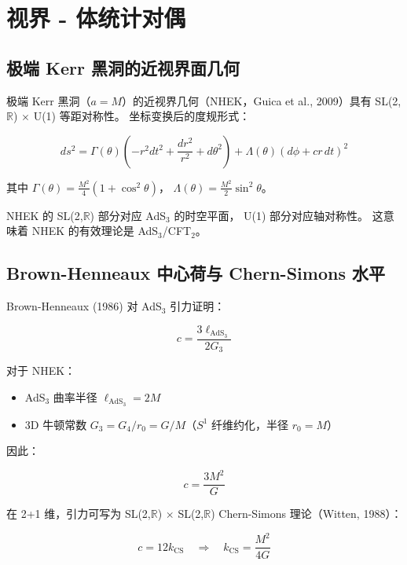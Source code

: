 \documentclass[11pt,a4paper]{article}
\begin{document}
\section{视界 - 体统计对偶}

\subsection{极端 Kerr 黑洞的近视界面几何}

极端 Kerr 黑洞（$a = M$）的近视界几何（NHEK，Guica et al., 2009）具有
SL(2,$\mathbb{R}$) $\times$ U(1) 等距对称性。
坐标变换后的度规形式：

\begin{equation}
ds^2 = \Gamma(\theta)\left(-r^2 dt^2 + \frac{dr^2}{r^2} + d\theta^2\right) + \Lambda(\theta)(d\phi + cr\,dt)^2
\end{equation}

其中 $\Gamma(\theta) = \frac{M^2}{4}(1+\cos^2\theta)$，
$\Lambda(\theta) = \frac{M^2}{2}\sin^2\theta$。

NHEK 的 SL(2,$\mathbb{R}$) 部分对应 AdS$_3$ 的时空平面，
U(1) 部分对应轴对称性。
这意味着 NHEK 的有效理论是 AdS$_3$/CFT$_2$。

\subsection{Brown-Henneaux 中心荷与 Chern-Simons 水平}

Brown-Henneaux (1986) 对 AdS$_3$ 引力证明：

\begin{equation}
c = \frac{3\ell_{\text{AdS}_3}}{2G_3}
\end{equation}

对于 NHEK：
\begin{itemize}
\item AdS$_3$ 曲率半径 $\ell_{\text{AdS}_3} = 2M$
\item 3D 牛顿常数 $G_3 = G_4/r_0 = G/M$（$S^1$ 纤维约化，半径 $r_0 = M$）
\end{itemize}

因此：

\begin{equation}
c = \frac{3M^2}{G}
\end{equation}

在 2+1 维，引力可写为 SL(2,$\mathbb{R}$) $\times$ SL(2,$\mathbb{R}$)
Chern-Simons 理论（Witten, 1988）：

\begin{equation}
c = 12k_{\text{CS}} \quad\Rightarrow\quad k_{\text{CS}} = \frac{M^2}{4G}
\end{equation}
\end{document}
